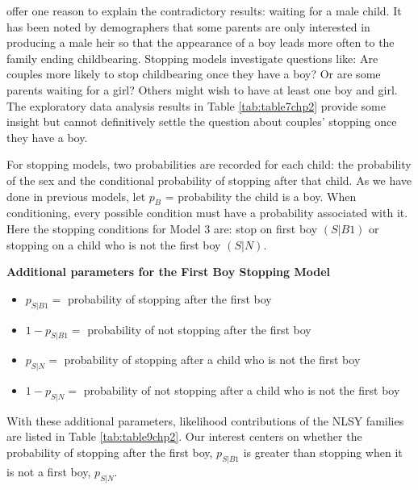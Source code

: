 \documentclass[
]{krantz}
\providecommand{\tightlist}{%
  \setlength{\itemsep}{0pt}\setlength{\parskip}{0pt}}
\newcommand{\bstop}{p_{S|B1}}
\newcommand{\nstop}{p_{S|N}}
\begin{document}
\citet{Rodgers2001} offer one reason to explain the contradictory results: waiting for a male child. It has been noted by demographers that some parents are only interested in producing a male heir so that the appearance of a boy leads more often to the family ending childbearing. Stopping models investigate questions like: Are couples more likely to stop childbearing once they have a boy? Or are some parents waiting for a girl? Others might wish to have at least one boy and girl. The exploratory data analysis results in Table \ref{tab:table7chp2} provide some insight but cannot definitively settle the question about couples' stopping once they have a boy.

For stopping models, two probabilities are recorded for each child: the probability of the sex and the conditional probability of stopping after that child. As we have done in previous models, let \(p_B\) = probability the child is a boy. When conditioning, every possible condition must have a probability associated with it. Here the stopping conditions for Model 3 are: stop on first boy \((S|B1)\) or stopping on a child who is not the first boy \((S|N)\).

\textbf{Additional parameters for the First Boy Stopping Model}

\begin{itemize}
\tightlist
\item
  \(\bstop =\) probability of stopping after the first boy
\item
  \(1 - \bstop =\) probability of not stopping after the first boy
\item
  \(\nstop =\) probability of stopping after a child who is not the first boy
\item
  \(1 - \nstop =\) probability of not stopping after a child who is not the first boy
\end{itemize}

With these additional parameters, likelihood contributions of the NLSY families are listed in Table \ref{tab:table9chp2}. Our interest centers on whether the probability of stopping after the first boy, \(\bstop\) is greater than stopping when it is not a first boy, \(\nstop\).
\end{document}
